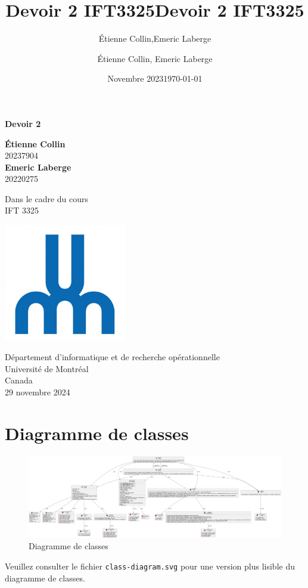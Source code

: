 \documentclass[french]{article}
\title{Devoir 2 IFT3325}
\author{Étienne Collin,Emeric Laberge}
\date{Novembre 2023}
\begin{document}
 \title{Devoir 2 IFT3325}
\author{Étienne Collin, Emeric Laberge}
\date{\today}
\begin{titlepage}
	\begin{center}
		\vspace*{1cm}

		\Huge
		\textbf{Devoir 2}

		\vspace{0.5cm}
		\LARGE

		\vspace{1.5cm}


		\textbf{Étienne Collin}\\ 20237904 \\

		\textbf{Emeric Laberge}\\ 20220275

		\vfill

		Dans le cadre du cours\\
		IFT 3325


		\vspace{0.8cm}

		\includegraphics[width=0.4\textwidth]{udem.jpg}

		\Large
		Département d'informatique et de recherche opérationnelle\\
		Université de Montréal\\
		Canada\\
		29 novembre 2024

	\end{center}
\end{titlepage} 

\section{Diagramme de classes} 
\begin{figure}[h]
  \centering
  \includegraphics[width=1\textwidth]{../class-diagram/class-diagram.png}
  \caption{Diagramme de classes} 
\end{figure}

Veuillez consulter le fichier \texttt{class-diagram.svg} pour une version plus
lisible du diagramme de classes. 
\end{document}
